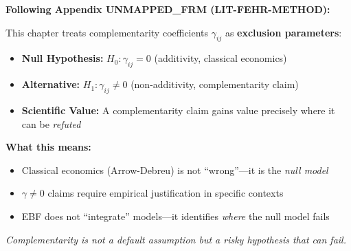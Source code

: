 \begin{tcolorbox}[
    colback=red!5!white,
    colframe=red!75!black,
    title={\textbf{Methodological Note: The Exclusion Principle}},
    fonttitle=\bfseries
]
\textbf{Following Appendix UNMAPPED_FRM (LIT-FEHR-METHOD):}

This chapter treats complementarity coefficients $\gamma_{ij}$ as \textbf{exclusion parameters}:
\begin{itemize}[nosep]
    \item \textbf{Null Hypothesis:} $H_0: \gamma_{ij} = 0$ (additivity, classical economics)
    \item \textbf{Alternative:} $H_1: \gamma_{ij} \neq 0$ (non-additivity, complementarity claim)
    \item \textbf{Scientific Value:} A complementarity claim gains value precisely where it can be \textit{refuted}
\end{itemize}

\medskip
\textbf{What this means:}
\begin{itemize}[nosep]
    \item Classical economics (Arrow-Debreu) is not ``wrong''---it is the \textit{null model}
    \item $\gamma \neq 0$ claims require empirical justification in specific contexts
    \item EBF does not ``integrate'' models---it identifies \textit{where} the null model fails
\end{itemize}

\textit{Complementarity is not a default assumption but a risky hypothesis that can fail.}
\end{tcolorbox}

